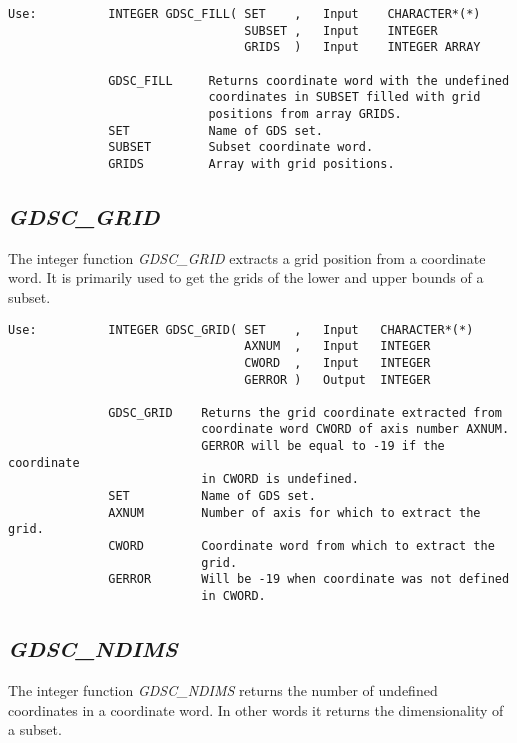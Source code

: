 \begin{verbatim}
Use:          INTEGER GDSC_FILL( SET    ,   Input    CHARACTER*(*)
                                 SUBSET ,   Input    INTEGER
                                 GRIDS  )   Input    INTEGER ARRAY

              GDSC_FILL     Returns coordinate word with the undefined
                            coordinates in SUBSET filled with grid
                            positions from array GRIDS.
              SET           Name of GDS set.
              SUBSET        Subset coordinate word.
              GRIDS         Array with grid positions.
\end{verbatim}

\subsection{\sl GDSC\_GRID\/}

The integer function {\sl GDSC\_GRID\/} extracts a grid position from a
coordinate word. It is primarily used to get the grids of the lower and
upper bounds of a subset.

\begin{verbatim}
Use:          INTEGER GDSC_GRID( SET    ,   Input   CHARACTER*(*)
                                 AXNUM  ,   Input   INTEGER
                                 CWORD  ,   Input   INTEGER
                                 GERROR )   Output  INTEGER

              GDSC_GRID    Returns the grid coordinate extracted from
                           coordinate word CWORD of axis number AXNUM.
                           GERROR will be equal to -19 if the coordinate
                           in CWORD is undefined.
              SET          Name of GDS set.
              AXNUM        Number of axis for which to extract the grid.
              CWORD        Coordinate word from which to extract the
                           grid.
              GERROR       Will be -19 when coordinate was not defined
                           in CWORD.
\end{verbatim}

\subsection{\sl GDSC\_NDIMS\/}

The integer function {\sl GDSC\_NDIMS\/} returns the number of undefined
coordinates in a coordinate word. In other words it returns the
dimensionality of a subset.

